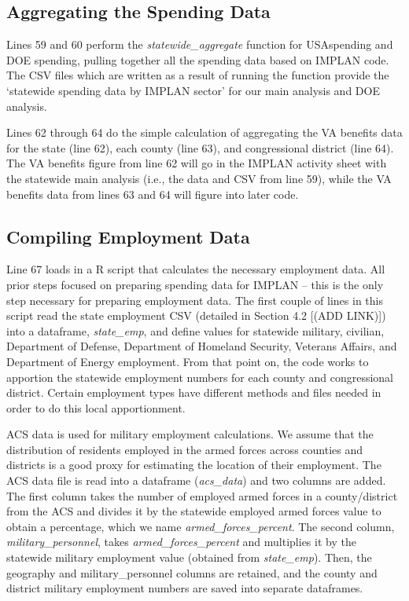 \documentclass[
]{book}
\begin{document}
\hypertarget{agg-data}{%
\subsection{Aggregating the Spending Data}\label{agg-data}}

Lines 59 and 60 perform the \emph{statewide\_aggregate} function for USAspending and DOE spending, pulling together all the spending data based on IMPLAN code. The CSV files which are written as a result of running the function provide the `statewide spending data by IMPLAN sector' for our main analysis and DOE analysis.

Lines 62 through 64 do the simple calculation of aggregating the VA benefits data for the state (line 62), each county (line 63), and congressional district (line 64). The VA benefits figure from line 62 will go in the IMPLAN activity sheet with the statewide main analysis (i.e., the data and CSV from line 59), while the VA benefits data from lines 63 and 64 will figure into later code.

\hypertarget{compile-emp}{%
\subsection{Compiling Employment Data}\label{compile-emp}}

Line 67 loads in a R script that calculates the necessary employment data. All prior steps focused on preparing spending data for IMPLAN -- this is the only step necessary for preparing employment data. The first couple of lines in this script read the state employment CSV (detailed in Section 4.2 {[}(ADD LINK){]}) into a dataframe, \emph{state\_emp}, and define values for statewide military, civilian, Department of Defense, Department of Homeland Security, Veterans Affairs, and Department of Energy employment. From that point on, the code works to apportion the statewide employment numbers for each county and congressional district. Certain employment types have different methods and files needed in order to do this local apportionment.

ACS data is used for military employment calculations. We assume that the distribution of residents employed in the armed forces across counties and districts is a good proxy for estimating the location of their employment. The ACS data file is read into a dataframe (\emph{acs\_data}) and two columns are added. The first column takes the number of employed armed forces in a county/district from the ACS and divides it by the statewide employed armed forces value to obtain a percentage, which we name \emph{armed\_forces\_percent}. The second column, \emph{military\_personnel}, takes \emph{armed\_forces\_percent} and multiplies it by the statewide military employment value (obtained from \emph{state\_emp}). Then, the geography and military\_personnel columns are retained, and the county and district military employment numbers are saved into separate dataframes.
\end{document}
